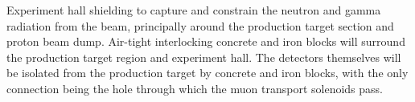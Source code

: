 {}
{}
{\phaseI}
{Experiment hall shielding to capture and constrain the neutron and gamma radiation from the beam, principally around the production target section and proton beam dump.
  Air-tight interlocking concrete and iron blocks will surround the production target region and experiment hall.
  The detectors themselves will be isolated from the production target by concrete and iron blocks, with the only connection being the hole through which the muon transport solenoids pass.
 }
{}
